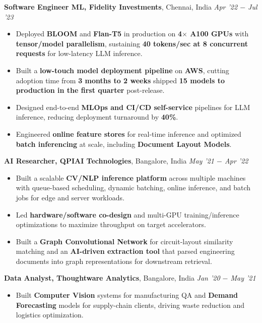 \documentclass[10pt,a4]{article}
\begin{document}
{\begin{flushleft}
    \vspace{0.5mm}
    \hspace{1.5mm} \textbf{\large Software Engineer \textendash{} ML, Fidelity Investments},  Chennai, India \hfill \textit{\large Apr '22 $-$ Jul '23}	\\
    \begin{itemize}
        \item Deployed \textbf{BLOOM} and \textbf{Flan-T5} in production on \textbf{4$\times$ A100 GPUs} with \textbf{tensor/model parallelism}, sustaining \textbf{40 tokens/sec at 8 concurrent requests} for low-latency LLM inference.
        \item Built a \textbf{low-touch model deployment pipeline} on \textbf{AWS}, cutting adoption time from \textbf{3 months to 2 weeks} \textendash{} shipped \textbf{15 models to production in the first quarter} post-release.
        \item Designed end-to-end \textbf{MLOps and CI/CD self-service} pipelines for LLM inference, reducing deployment turnaround by \textbf{40\%}.
        \item Engineered \textbf{online feature stores} for real-time inference and optimized \textbf{batch inferencing} at scale, including \textbf{Document Layout Models}.
    \end{itemize}

    \vspace{0.5mm}
    \hspace{1.5mm} \textbf{\large AI Researcher, QPIAI Technologies},  Bangalore, India \hfill \textit{\large May '21 $-$ Apr '22}	\\
    \begin{itemize}
        \item Built a scalable \textbf{CV/NLP inference platform} across multiple machines with queue-based scheduling, dynamic batching, online inference, and batch jobs for edge and server workloads.
        \item Led \textbf{hardware/software co-design} and multi-GPU training/inference optimizations to maximize throughput on target accelerators.
        \item Built a \textbf{Graph Convolutional Network} for circuit-layout similarity matching and an \textbf{AI-driven extraction tool} that parsed engineering documents into graph representations for downstream retrieval.
    \end{itemize}

    \vspace{0.5mm}
    \hspace{1.5mm} \textbf{\large Data Analyst, Thoughtware Analytics},  Bangalore, India \hfill \textit{\large Jan '20 $-$ May '21}	\\
    \begin{itemize}
        \item Built \textbf{Computer Vision} systems for manufacturing QA and \textbf{Demand Forecasting} models for supply-chain clients, driving waste reduction and logistics optimization.
    \end{itemize}


\end{flushleft}}
\end{document}
